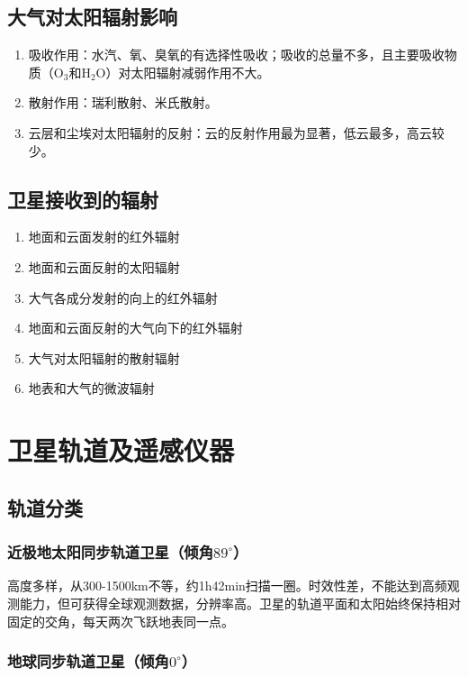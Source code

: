 \documentclass[UTF8,11pt]{ctexbook}
\begin{document}
\subsection{大气对太阳辐射影响}
\begin{enumerate}
    \item 吸收作用：水汽、氧、臭氧的有选择性吸收；吸收的总量不多，且主要吸收物质（\(\mathrm{O}_3\)和\(\mathrm{H_2O}\)）对太阳辐射减弱作用不大。
    \item 散射作用：瑞利散射、米氏散射。
    \item 云层和尘埃对太阳辐射的反射：云的反射作用最为显著，低云最多，高云较少。
\end{enumerate}

\subsection{卫星接收到的辐射}
\begin{enumerate}
    \item 地面和云面发射的红外辐射
    \item 地面和云面反射的太阳辐射
    \item 大气各成分发射的向上的红外辐射
    \item 地面和云面反射的大气向下的红外辐射
    \item 大气对太阳辐射的散射辐射
    \item 地表和大气的微波辐射
\end{enumerate}

\section{卫星轨道及遥感仪器}

\subsection{轨道分类}

\subsubsection{近极地太阳同步轨道卫星（倾角\(89^\circ\)）}

高度多样，从300-1500km不等，约1h42min扫描一圈。时效性差，不能达到高频观测能力，但可获得全球观测数据，分辨率高。卫星的轨道平面和太阳始终保持相对固定的交角，每天两次飞跃地表同一点。

\subsubsection{地球同步轨道卫星（倾角\(0^\circ\)）}
\end{document}
